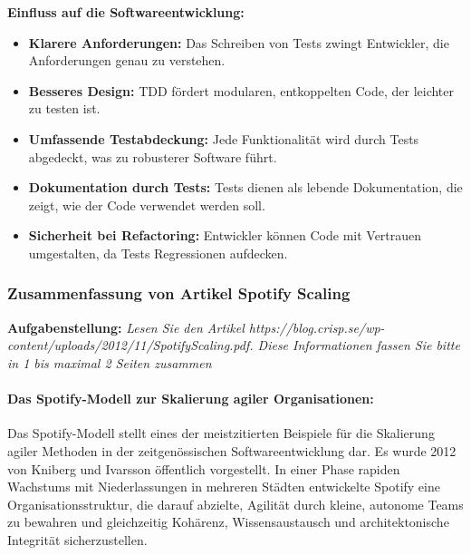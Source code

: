 \textbf{Einfluss auf die Softwareentwicklung:}
\begin{itemize}
    \item \textbf{Klarere Anforderungen:} Das Schreiben von Tests zwingt Entwickler, die Anforderungen genau zu verstehen.
    \item \textbf{Besseres Design:} TDD fördert modularen, entkoppelten Code, der leichter zu testen ist.
    \item \textbf{Umfassende Testabdeckung:} Jede Funktionalität wird durch Tests abgedeckt, was zu robusterer Software führt.
    \item \textbf{Dokumentation durch Tests:} Tests dienen als lebende Dokumentation, die zeigt, wie der Code verwendet werden soll.
    \item \textbf{Sicherheit bei Refactoring:} Entwickler können Code mit Vertrauen umgestalten, da Tests Regressionen aufdecken.
\end{itemize}



\subsubsection{Zusammenfassung von Artikel Spotify Scaling}
\textbf{Aufgabenstellung:} \textit{Lesen Sie den Artikel https://blog.crisp.se/wp-content/uploads/2012/11/SpotifyScaling.pdf.
Diese Informationen fassen Sie bitte in 1 bis maximal 2 Seiten zusammen}

\paragraph{Das Spotify-Modell zur Skalierung agiler Organisationen:}Das Spotify-Modell stellt eines der meistzitierten Beispiele für die Skalierung agiler Methoden in der zeitgenössischen Softwareentwicklung dar. 
Es wurde 2012 von Kniberg und Ivarsson öffentlich vorgestellt. In einer Phase rapiden Wachstums mit Niederlassungen in mehreren Städten entwickelte Spotify eine Organisationsstruktur, die darauf abzielte, 
Agilität durch kleine, autonome Teams zu bewahren und gleichzeitig Kohärenz, Wissensaustausch und architektonische Integrität sicherzustellen.
